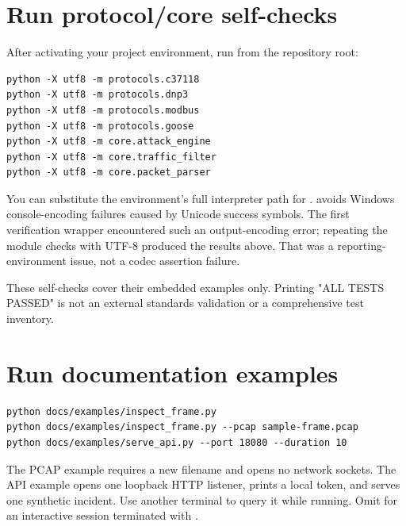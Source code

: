 \section*{Run protocol/core self-checks}
\par\noindent\begin{minipage}{\linewidth}
After activating your project environment, run from the repository root:
\begin{lstlisting}[title={BASH}]
python -X utf8 -m protocols.c37118
python -X utf8 -m protocols.dnp3
python -X utf8 -m protocols.modbus
python -X utf8 -m protocols.goose
python -X utf8 -m core.attack_engine
python -X utf8 -m core.traffic_filter
python -X utf8 -m core.packet_parser
\end{lstlisting}
\end{minipage}\par
You can substitute the environment's full interpreter path for .  avoids Windows console-encoding failures caused by Unicode success symbols. The first verification wrapper encountered such an output-encoding error; repeating the module checks with UTF-8 produced the results above. That was a reporting-environment issue, not a codec assertion failure.

These self-checks cover their embedded examples only. Printing "ALL TESTS PASSED" is not an external standards validation or a comprehensive test inventory.

\section*{Run documentation examples}
\par\noindent\begin{minipage}{\linewidth}
\begin{lstlisting}[title={BASH}]
python docs/examples/inspect_frame.py
python docs/examples/inspect_frame.py --pcap sample-frame.pcap
python docs/examples/serve_api.py --port 18080 --duration 10
\end{lstlisting}
\end{minipage}\par
The PCAP example requires a new filename and opens no network sockets. The API example opens one loopback HTTP listener, prints a local token, and serves one synthetic incident. Use another terminal to query it while running. Omit  for an interactive session terminated with .

